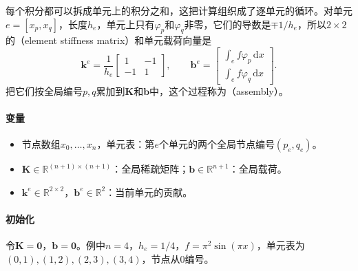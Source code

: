 每个积分都可以拆成单元上的积分之和，这把计算组织成了逐单元的循环。对单元$e=[x_{p},x_{q}]$，长度$h_e$，单元上只有$\varphi_p$和$\varphi_q$非零，它们的导数是$\mp1/h_e$，所以$2\times2$的（element stiffness matrix）和单元载荷向量是
\begin{equation}
 \bm{k}^{e}=\frac{1}{h_e}\begin{bmatrix}1&-1\\-1&1\end{bmatrix},\qquad
 \bm{b}^{e}=\begin{bmatrix}\int_ef\varphi_p\,\mathrm{d}x\\\int_ef\varphi_q\,\mathrm{d}x\end{bmatrix}.
 \label{eq:pdenum-element-matrix}
\end{equation}
把它们按全局编号$p,q$累加到$\bm{K}$和$\bm{b}$中，这个过程称为（assembly）。

\paragraph{变量}
\begin{itemize}
 \item 节点数组$x_0,\ldots,x_n$，单元表：第$e$个单元的两个全局节点编号$(p_e,q_e)$。
 \item $\bm{K}\in\mathbb{R}^{(n+1)\times(n+1)}$：全局稀疏矩阵；$\bm{b}\in\mathbb{R}^{n+1}$：全局载荷。
 \item $\bm{k}^{e}\in\mathbb{R}^{2\times2}$，$\bm{b}^{e}\in\mathbb{R}^2$：当前单元的贡献。
\end{itemize}

\paragraph{初始化}
令$\bm{K}=\bm{0}$，$\bm{b}=\bm{0}$。例中$n=4$，$h_e=1/4$，$f=\pi^2\sin(\pi x)$，单元表为$(0,1),(1,2),(2,3),(3,4)$，节点从$0$编号。

